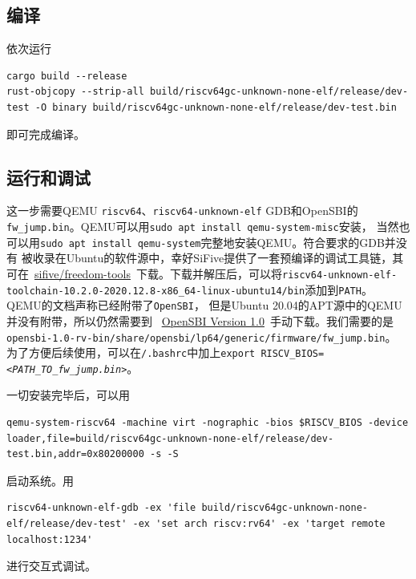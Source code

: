 \documentclass{../runikraft-report}
\begin{document}
\subsection{编译}
依次运行
\begin{lstlisting}
cargo build --release
rust-objcopy --strip-all build/riscv64gc-unknown-none-elf/release/dev-test -O binary build/riscv64gc-unknown-none-elf/release/dev-test.bin
\end{lstlisting}
即可完成编译。

\subsection{运行和调试}
这一步需要QEMU \texttt{riscv64}、\texttt{riscv64-unknown-elf} GDB和OpenSBI的
\texttt{fw\_jump.bin}。QEMU可以用\texttt{sudo apt install qemu-system-misc}安装，
当然也可以用\texttt{sudo apt install qemu-system}完整地安装QEMU。符合要求的GDB并没有
被收录在Ubuntu的软件源中，幸好SiFive提供了一套预编译的调试工具链，其可在\
\href{https://github.com/sifive/freedom-tools/releases}{sifive/freedom-tools}\
下载。下载并解压后，可以将\texttt{riscv64-unknown-elf-toolchain-10.2.0-2020.12.8-x86\_64-linux-ubuntu14/bin}添加到\texttt{PATH}。
QEMU的文档声称已经附带了\texttt{OpenSBI}\cite{bib:qemu-virt}，
但是Ubuntu 20.04的APT源中的QEMU并没有附带，所以仍然需要到
\ \href{https://github.com/riscv-software-src/opensbi/releases/tag/v1.0}{OpenSBI Version 1.0}\
手动下载。我们需要的是\linebreak\texttt{opensbi-1.0-rv-bin/share/opensbi/lp64/generic/firmware/fw\_jump.bin}。
为了方便后续使用，可以在\texttt{\tildechar/.bashrc}中加上\texttt{export RISCV\_BIOS=\textit{<PATH\_TO\_fw\_jump.bin>}}。

一切安装完毕后，可以用
\begin{lstlisting}
qemu-system-riscv64 -machine virt -nographic -bios $RISCV_BIOS -device loader,file=build/riscv64gc-unknown-none-elf/release/dev-test.bin,addr=0x80200000 -s -S
\end{lstlisting}
启动系统。用
\begin{lstlisting}
riscv64-unknown-elf-gdb -ex 'file build/riscv64gc-unknown-none-elf/release/dev-test' -ex 'set arch riscv:rv64' -ex 'target remote localhost:1234'
\end{lstlisting}
进行交互式调试。
\end{document}
